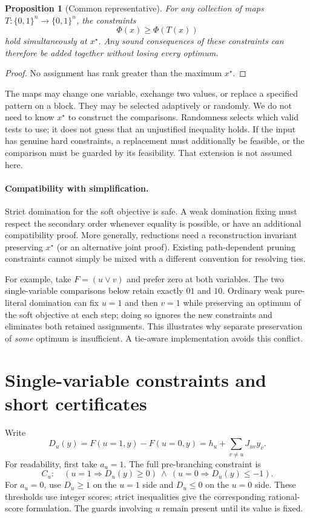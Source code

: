 \documentclass[11pt,a4paper]{article}
\newtheorem{proposition}[theorem]{Proposition}
\theoremstyle{remark}
\begin{document}
\begin{proposition}[Common representative]\label{prop:representative}
For any collection of maps $T:\{0,1\}^n\to\{0,1\}^n$, the constraints
\[
 \Phi(x)\ge \Phi(T(x))
\]
hold simultaneously at $x^\star$. Any sound consequences of these
constraints can therefore be added together without losing every optimum.
\end{proposition}
\begin{proof}
No assignment has rank greater than the maximum $x^\star$.
\end{proof}

The maps may change one variable, exchange two values, or replace a
specified pattern on a block. They may be selected adaptively or randomly.
We do not need to know $x^\star$ to construct the comparisons. Randomness
selects which valid tests to use; it does not guess that an unjustified
inequality holds. If the input has genuine hard constraints, a replacement
must additionally be feasible, or the comparison must be guarded by its
feasibility. That extension is not assumed here.

\paragraph{Compatibility with simplification.}
Strict domination for the soft objective is safe. A weak domination
fixing must respect the secondary order whenever equality is possible,
or have an additional compatibility proof. More generally, reductions
need a reconstruction invariant preserving $x^\star$ (or an alternative
joint proof). Existing path-dependent pruning constraints cannot simply
be mixed with a different convention for resolving ties.

For example, take $F=(u\lor v)$ and prefer zero at both variables. The
two single-variable comparisons below retain exactly $01$ and $10$.
Ordinary weak pure-literal domination can fix $u=1$ and then $v=1$
while preserving an optimum of the soft objective at each step; doing
so ignores the new constraints and eliminates both retained assignments.
This illustrates why separate preservation of \emph{some} optimum is
insufficient. A tie-aware implementation avoids this conflict.

\section{Single-variable constraints and short certificates}

Write
\[
 D_u(y)=F(u=1,y)-F(u=0,y)
       =h_u+\sum_{v\ne u}J_{uv}y_v.
\]
For readability, first take $a_u=1$. The full pre-branching constraint is
\begin{equation}
 C_u:\quad
 (u=1\Rightarrow D_u(y)\ge0)
 \ \land\ (u=0\Rightarrow D_u(y)\le-1).
                                                        \label{eq:guard}
\end{equation}
For $a_u=0$, use $D_u\ge1$ on the $u=1$ side and $D_u\le0$ on the
$u=0$ side. These thresholds use integer scores; strict inequalities
give the corresponding rational-score formulation. The guards involving
$u$ remain present until its value is fixed.
\end{document}
